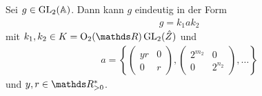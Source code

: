 \begin{prop}
Sei $g \in \operatorname{GL}_2(\mathbb{A})$. Dann kann $g$ eindeutig in der Form
\begin{align*}
g=k_1 a k_2
\end{align*}
mit $k_1,k_2 \in K=\Oo_2(\R) \GL_2(\hat{Z})$ und
\begin{align*}
a=\left\lbrace \begin{pmatrix}
yr&0\\
0&r
\end{pmatrix}, \begin{pmatrix}
2^{m_2}&0\\
0&2^{n_2}
\end{pmatrix},\dots \right\rbrace
\end{align*}
und $y,r \in \R^\ast_{>0}$.
\end{prop}